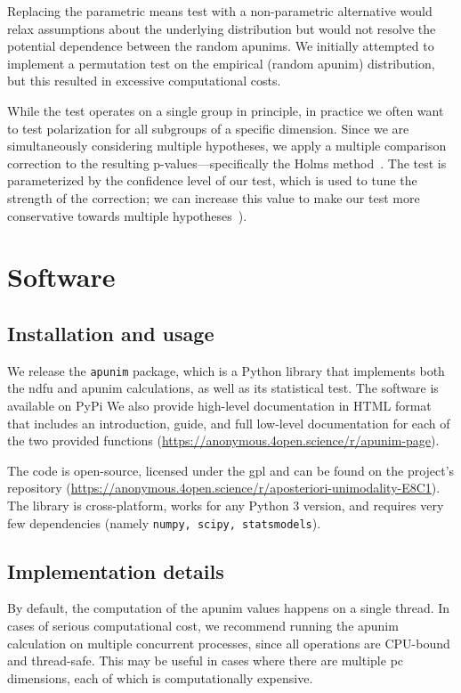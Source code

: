 \documentclass{article} %
\theoremstyle{definition}
\theoremstyle{plain}
\newcommand{\doclink}{\url{https://anonymous.4open.science/r/apunim-page}}
\newcommand{\explink}{\url{https://anonymous.4open.science/r/aposteriori-unimodality-E8C1}}
\begin{document}
Replacing the parametric means test with a non-parametric alternative would relax assumptions about the underlying distribution but would not resolve the potential dependence between the random apunims. We initially attempted to implement a permutation test on the empirical (random apunim) distribution, but this resulted in excessive computational costs.

While the test operates on a single group in principle, in practice we often want to test polarization for all subgroups of a specific dimension. Since we are simultaneously considering multiple hypotheses, we apply a multiple comparison correction to the resulting p-values---specifically the Holms method~\cite{holms}. The test is parameterized by the confidence level of our test, which is used to tune the strength of the correction; we can increase this value to make our test more conservative towards multiple hypotheses~\cite{ChenFengYi2017}).


\section{Software}
\label{app:software}

\subsection{Installation and usage}
We release the \texttt{apunim} package, which is a Python library that implements both the \ac{ndfu} and apunim calculations, as well as its statistical test. The software is available on PyPi We also provide high-level documentation in HTML format that includes an introduction, guide, and full low-level documentation for each of the two provided functions (\doclink).

The code is open-source, licensed under the \ac{gpl} and can be found on the project's repository (\explink). The library is cross-platform, works for any Python 3 version, and requires very few dependencies (namely \texttt{numpy, scipy, statsmodels}).

\subsection{Implementation details}
By default, the computation of the apunim values happens on a single thread. In cases of serious computational cost, we recommend running the apunim calculation on multiple concurrent processes, since all operations are CPU-bound and thread-safe. This may be useful in cases where there are multiple \ac{pc} dimensions, each of which is computationally expensive. 
\end{document}
